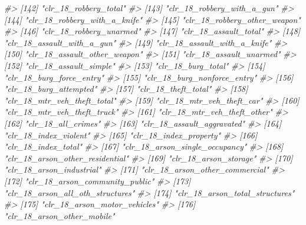 \documentclass[
]{krantz}
\makeatletter
\newenvironment{Shaded}{\begin{snugshade}}{\end{snugshade}}
\newcommand{\CommentTok}[1]{\textcolor[rgb]{0.37,0.37,0.37}{\textit{#1}}}
\newenvironment{kframe}{%
\medskip{}
\setlength{\fboxsep}{.8em}
 \def\at@end@of@kframe{}%
 \ifinner\ifhmode%
  \def\at@end@of@kframe{\end{minipage}}%
  \begin{minipage}{\columnwidth}%
 \fi\fi%
 \def\FrameCommand##1{\hskip\@totalleftmargin \hskip-\fboxsep
 \colorbox{shadecolor}{##1}\hskip-\fboxsep
     \hskip-\linewidth \hskip-\@totalleftmargin \hskip\columnwidth}%
 \MakeFramed {\advance\hsize-\width
   \@totalleftmargin\z@ \linewidth\hsize
   \@setminipage}}%
 {\par\unskip\endMakeFramed%
 \at@end@of@kframe}
\renewenvironment{Shaded}{\begin{kframe}}{\end{kframe}}
\makeatother
\begin{document}
\begin{Shaded}
\begin{Highlighting}[]
\CommentTok{\#\textgreater{} [142] "clr\_18\_robbery\_total"            }
\CommentTok{\#\textgreater{} [143] "clr\_18\_robbery\_with\_a\_gun"       }
\CommentTok{\#\textgreater{} [144] "clr\_18\_robbery\_with\_a\_knife"     }
\CommentTok{\#\textgreater{} [145] "clr\_18\_robbery\_other\_weapon"     }
\CommentTok{\#\textgreater{} [146] "clr\_18\_robbery\_unarmed"          }
\CommentTok{\#\textgreater{} [147] "clr\_18\_assault\_total"            }
\CommentTok{\#\textgreater{} [148] "clr\_18\_assault\_with\_a\_gun"       }
\CommentTok{\#\textgreater{} [149] "clr\_18\_assault\_with\_a\_knife"     }
\CommentTok{\#\textgreater{} [150] "clr\_18\_assault\_other\_weapon"     }
\CommentTok{\#\textgreater{} [151] "clr\_18\_assault\_unarmed"          }
\CommentTok{\#\textgreater{} [152] "clr\_18\_assault\_simple"           }
\CommentTok{\#\textgreater{} [153] "clr\_18\_burg\_total"               }
\CommentTok{\#\textgreater{} [154] "clr\_18\_burg\_force\_entry"         }
\CommentTok{\#\textgreater{} [155] "clr\_18\_burg\_nonforce\_entry"      }
\CommentTok{\#\textgreater{} [156] "clr\_18\_burg\_attempted"           }
\CommentTok{\#\textgreater{} [157] "clr\_18\_theft\_total"              }
\CommentTok{\#\textgreater{} [158] "clr\_18\_mtr\_veh\_theft\_total"      }
\CommentTok{\#\textgreater{} [159] "clr\_18\_mtr\_veh\_theft\_car"        }
\CommentTok{\#\textgreater{} [160] "clr\_18\_mtr\_veh\_theft\_truck"      }
\CommentTok{\#\textgreater{} [161] "clr\_18\_mtr\_veh\_theft\_other"      }
\CommentTok{\#\textgreater{} [162] "clr\_18\_all\_crimes"               }
\CommentTok{\#\textgreater{} [163] "clr\_18\_assault\_aggravated"       }
\CommentTok{\#\textgreater{} [164] "clr\_18\_index\_violent"            }
\CommentTok{\#\textgreater{} [165] "clr\_18\_index\_property"           }
\CommentTok{\#\textgreater{} [166] "clr\_18\_index\_total"              }
\CommentTok{\#\textgreater{} [167] "clr\_18\_arson\_single\_occupancy"   }
\CommentTok{\#\textgreater{} [168] "clr\_18\_arson\_other\_residential"  }
\CommentTok{\#\textgreater{} [169] "clr\_18\_arson\_storage"            }
\CommentTok{\#\textgreater{} [170] "clr\_18\_arson\_industrial"         }
\CommentTok{\#\textgreater{} [171] "clr\_18\_arson\_other\_commercial"   }
\CommentTok{\#\textgreater{} [172] "clr\_18\_arson\_community\_public"   }
\CommentTok{\#\textgreater{} [173] "clr\_18\_arson\_all\_oth\_structures" }
\CommentTok{\#\textgreater{} [174] "clr\_18\_arson\_total\_structures"   }
\CommentTok{\#\textgreater{} [175] "clr\_18\_arson\_motor\_vehicles"     }
\CommentTok{\#\textgreater{} [176] "clr\_18\_arson\_other\_mobile"       }

\end{Highlighting}
\end{Shaded}
\end{document}
